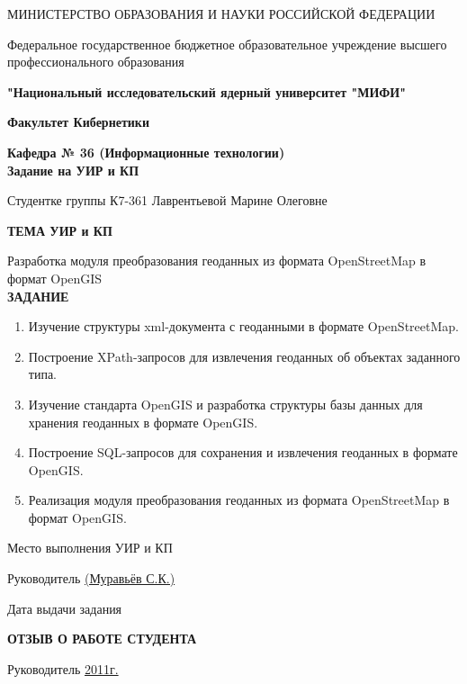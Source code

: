 \documentclass[12pt,a4paper,oneside]{article} %
\begin{document}
\onehalfspacing
\pagestyle{empty} %
\newpage
\begin{center}
{\small МИНИСТЕРСТВО ОБРАЗОВАНИЯ И НАУКИ РОССИЙСКОЙ ФЕДЕРАЦИИ

Федеральное государственное бюджетное образовательное учреждение высшего профессионального образования

\textbf{"Национальный исследовательский ядерный университет "МИФИ"}
\\[50pt]
}
\textbf{Факультет Кибернетики}

\textbf{Кафедра № 36 (Информационные технологии)
\\[50pt]
\Large{Задание на УИР и КП}}
\begin{flushleft}

Студентке группы К7-361 Лаврентьевой Марине Олеговне
\\[40pt]
\end{flushleft}

\textbf{ТЕМА УИР и КП}

Разработка модуля преобразования геоданных из формата OpenStreetMap в формат OpenGIS
\\[20pt]
\textbf{ЗАДАНИЕ}
\end{center}
\begin{enumerate}
\item Изучение структуры xml-документа с геоданными в формате OpenStreetMap.
\item Построение XPath-запросов для извлечения геоданных об объектах заданного типа.
\item Изучение стандарта OpenGIS и разработка структуры базы данных для хранения геоданных в формате OpenGIS.
\item Построение SQL-запросов для сохранения и извлечения геоданных в формате OpenGIS.
\item Реализация модуля преобразования геоданных из формата OpenStreetMap в формат OpenGIS.
\end{enumerate}

\newpage
\begin{flushleft}
Место выполнения УИР и КП \underline{\hspace{9cm}}

Руководитель \underline{\hspace{9cm} (Муравьёв С.К.)}

Дата выдачи задания \underline{\hspace{11cm}}
\end{flushleft}

\newpage
\begin{center}
\textbf{ОТЗЫВ О РАБОТЕ СТУДЕНТА}
\end{center}
\vfill
Руководитель \underline{\hspace{6cm}\glqq{\hspace{1cm}}\grqq\hspace{4cm}2011г.}
\end{document}
